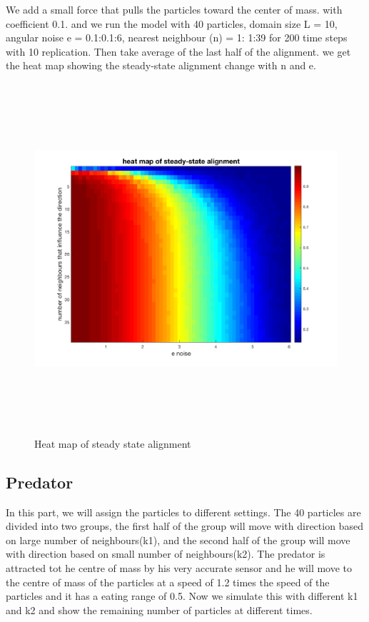 \documentclass[12pt]{article}
\begin{document}
We add a small force that pulls the particles toward the center of mass. with coefficient 0.1. and we run the model with 40 particles, domain size L = 10, angular noise e = 0.1:0.1:6, nearest neighbour (n) = 1: 1:39 for 200 time steps with 10 replication. Then take average of the last half of the alignment. we get the heat map showing the steady-state alignment change with n and e.
\begin{figure}[H] %
\centering
\includegraphics[width = 16 cm, height = 13cm]{heatmap.png}
\caption{Heat map of steady state alignment}
\label{fig:hm}
\end{figure}


\subsection{Predator}

In this part, we will assign the particles to different settings. The 40 particles are divided into two groups, the first half of the group will move with direction based on large number of neighbours(k1), and the second half of the group will move with direction based on small number of neighbours(k2). The predator is attracted tot he centre of mass by his very accurate sensor and he will move to the centre of mass of the particles at a speed of 1.2 times the speed of the particles and it has a eating range of 0.5. Now we simulate this with different k1 and k2 and show the remaining number of particles at different times. 
\end{document}
